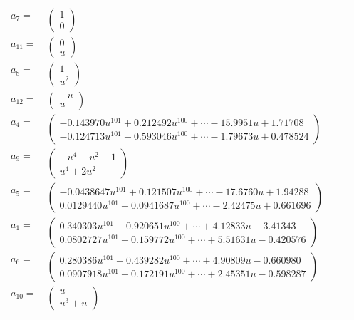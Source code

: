 \documentclass[1p]{elsarticle_modified}
\theoremstyle{definition}
\begin{document}
\begin{tabular}{m{7pt} m{180pt} m{7pt} m{180pt} }
\flushright $a_{7}=$&$\begin{pmatrix}1\\0\end{pmatrix}$ \\
\flushright $a_{11}=$&$\begin{pmatrix}0\\u\end{pmatrix}$ \\
\flushright $a_{8}=$&$\begin{pmatrix}1\\u^2\end{pmatrix}$ \\
\flushright $a_{12}=$&$\begin{pmatrix}- u\\u\end{pmatrix}$ \\
\flushright $a_{4}=$&$\begin{pmatrix}-0.143970 u^{101}+0.212492 u^{100}+\cdots-15.9951 u+1.71708\\-0.124713 u^{101}-0.593046 u^{100}+\cdots-1.79673 u+0.478524\end{pmatrix}$ \\
\flushright $a_{9}=$&$\begin{pmatrix}- u^4- u^2+1\\u^4+2 u^2\end{pmatrix}$ \\
\flushright $a_{5}=$&$\begin{pmatrix}-0.0438647 u^{101}+0.121507 u^{100}+\cdots-17.6760 u+1.94288\\0.0129440 u^{101}+0.0941687 u^{100}+\cdots-2.42475 u+0.661696\end{pmatrix}$ \\
\flushright $a_{1}=$&$\begin{pmatrix}0.340303 u^{101}+0.920651 u^{100}+\cdots+4.12833 u-3.41343\\0.0802727 u^{101}-0.159772 u^{100}+\cdots+5.51631 u-0.420576\end{pmatrix}$ \\
\flushright $a_{6}=$&$\begin{pmatrix}0.280386 u^{101}+0.439282 u^{100}+\cdots+4.90809 u-0.660980\\0.0907918 u^{101}+0.172191 u^{100}+\cdots+2.45351 u-0.598287\end{pmatrix}$ \\
\flushright $a_{10}=$&$\begin{pmatrix}u\\u^3+u\end{pmatrix}$ \\

\end{tabular}
\end{document}
